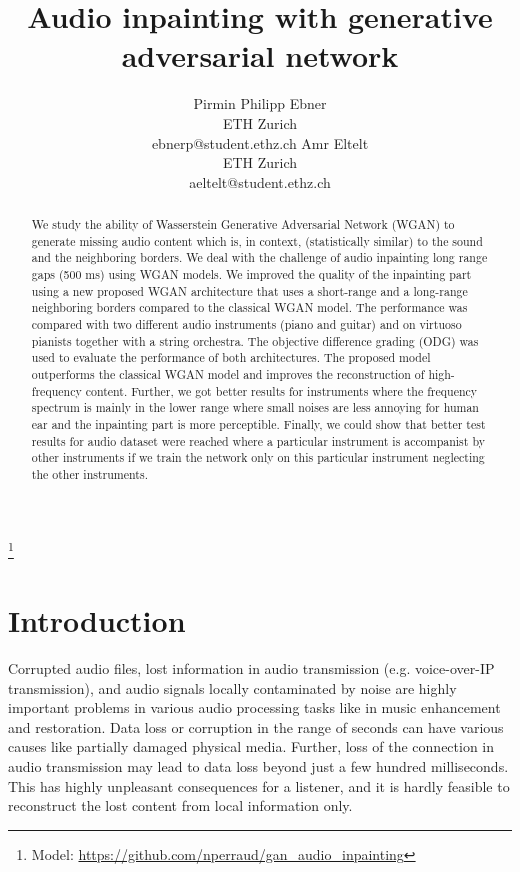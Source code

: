 \documentclass{article} %
\title{Audio inpainting with generative adversarial network}
\author{
Pirmin Philipp Ebner\\
ETH Zurich
\\
ebnerp@student.ethz.ch
\And
Amr Eltelt\\
ETH Zurich\\
aeltelt@student.ethz.ch
}
\begin{document}
\maketitle

\begin{abstract}
We study the ability of Wasserstein Generative Adversarial Network (WGAN) to generate missing audio content which is, in context, (statistically similar) to the sound and the neighboring borders. We deal with the challenge of audio inpainting long range gaps (500 ms) using WGAN models. We improved the quality of the inpainting part using a new proposed WGAN architecture that uses a short-range and a long-range neighboring borders compared to the classical WGAN model. The performance was compared with two different audio instruments (piano and guitar) and on virtuoso pianists together with a string orchestra. The objective difference grading (ODG) was used to evaluate the performance of both architectures. The proposed model outperforms the classical WGAN model and improves the reconstruction of high-frequency content. Further, we got better results for instruments where the frequency spectrum is mainly in the lower range where small noises are less annoying for human ear and the inpainting part is more perceptible. Finally, we could show that better test results for audio dataset were reached where a particular instrument is accompanist by other instruments if we train the network only on this particular instrument neglecting the other instruments. 

\end{abstract}
\let\thefootnote\relax\footnote{Model: \url{https://github.com/nperraud/gan_audio_inpainting}}
\section{Introduction}
Corrupted audio files, lost information in audio transmission (e.g. voice-over-IP transmission), and audio signals locally contaminated by noise are highly important problems in various audio processing tasks like in music enhancement and restoration. Data loss or corruption in the range of seconds can have various causes like partially damaged physical media. Further, loss of the connection in audio transmission may lead to data loss beyond just a few hundred milliseconds. This has highly unpleasant consequences for a listener, and it is hardly feasible to reconstruct the lost content from local information only.
\end{document}

